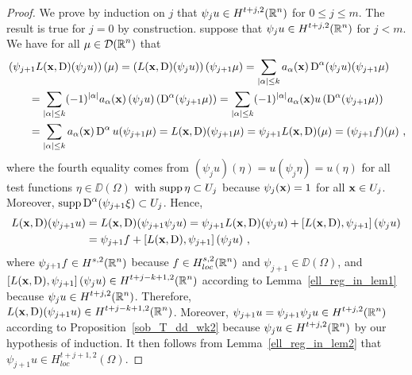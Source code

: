 \begin{proof}
We prove by induction on $j$ that $\displaystyle \psi_j u \in H^{t+j,2}(\mathbb{R}^n)$
for $0 \leq j \leq m$.  The result is true for $j=0$ by construction.  
suppose that $\displaystyle \psi_j u \in H^{t+j,2}(\mathbb{R}^n)$ for $j <m$.
We have for all $\displaystyle \mu \in \mathcal{D}(\mathbb{R}^n)$ that
\begin{align*}
&\left(\psi_{j+1} L(\mathbf{x},\operatorname{D}) (\psi_j u)\right)(\mu)
= \left(L(\mathbf{x},\operatorname{D}) (\psi_j u)\right) (\psi_{j+1} \mu)
= \sum_{|\alpha|\leq k} a_\alpha(\mathbf{x}) \operatorname{D}^\alpha(\psi_j u)(\psi_{j+1} \mu) \\
&\qquad = \sum_{|\alpha|\leq k} (-1)^{|\alpha|} a_\alpha(\mathbf{x})
\left(\psi_j u\right) \left(\operatorname{D}^\alpha(\psi_{j+1} \mu)\right)
= \sum_{|\alpha|\leq k} (-1)^{|\alpha|} a_\alpha(\mathbf{x}) u
\left(\operatorname{D}^\alpha(\psi_{j+1} \mu)\right) \\
&\qquad = \sum_{|\alpha|\leq k} a_\alpha(\mathbf{x}) \operatorname{D}^\alpha u (\psi_{j+1} \mu)
= L(\mathbf{x},\operatorname{D}) (\psi_{j+1} \mu)
= \psi_{j+1} L(\mathbf{x},\operatorname{D}) (\mu)
= (\psi_{j+1} f)(\mu) \ ,
\end{align*}
where the fourth equality comes from
$\displaystyle \left(\psi_j u\right)(\eta) = u(\psi_j \eta) = u(\eta)$
for all test functions $\eta \in \DD(\Omega)$ with
$\operatorname{supp} \eta \subset U_j$ because
$\psi_j(\mathbf{x}) = 1$ for all $\mathbf{x} \in U_j$.  Moreover, 
$\displaystyle \operatorname{supp} \operatorname{D}^\alpha(\psi_{j+1} \xi) \subset U_j$.
Hence,
\begin{align*}
L(\mathbf{x},\operatorname{D})(\psi_{j+1} u)
&= L(\mathbf{x},\operatorname{D})(\psi_{j+1} \psi_j u)
= \psi_{j+1} L(\mathbf{x},\operatorname{D})(\psi_j u)
+ \left[ L(\mathbf{x},\operatorname{D}),\psi_{j+1}\right](\psi_j u) \\
&= \psi_{j+1} f + \left[ L(\mathbf{x},\operatorname{D}),\psi_{j+1}\right](\psi_j u) \ ,
\end{align*}
where $\displaystyle \psi_{j+1} f \in H^{s,2}(\mathbb{R}^n)$ because
$\displaystyle f \in H^{s,2}_{loc}(\mathbb{R}^n)$ and $\psi_{j+1} \in \DD(\Omega)$,
and $\displaystyle \left[ L(\mathbf{x},\operatorname{D}),\psi_{j+1}\right](\psi_j u)
\in H^{t+j-k+1,2}(\mathbb{R}^n)$ according to 
Lemma~\ref{ell_reg_in_lem1} because
$\displaystyle \psi_j u \in H^{t+j,2}(\mathbb{R}^n)$.
Therefore, \\
$\displaystyle L(\mathbf{x},\operatorname{D})(\psi_{j+1} u) \in H^{t+j-k+1,2}(\mathbb{R}^n)$.
Moreover,
$\displaystyle \psi_{j+1} u = \psi_{j+1}\psi_j u \in H^{t+j,2}(\mathbb{R}^n)$
according to Proposition~\ref{sob_T_dd_wk2} because
$\displaystyle \psi_j u \in H^{t+j,2}(\mathbb{R}^n)$ by our hypothesis of induction.
It then follows from Lemma~\ref{ell_reg_in_lem2} that
$\displaystyle \psi_{j+1} u \in H^{t+j+1,2}_{loc}(\Omega)$.


\end{proof}
